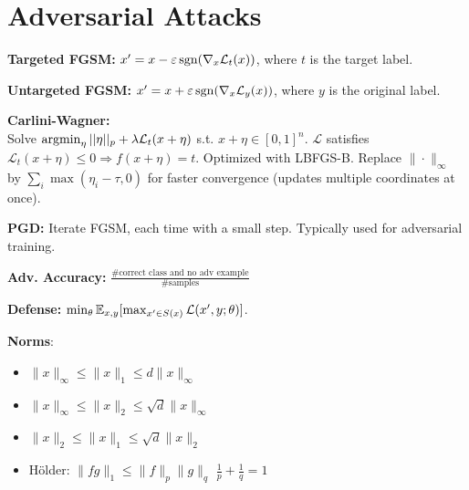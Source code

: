 \section{Adversarial Attacks}
\textbf{Targeted FGSM:} $x^\prime = x - \varepsilon \operatorname{\operatorname{sgn}}(\nabla_x \mathcal{L}_t(x))$, where $t$ is the target label.

\textbf{Untargeted FGSM:} $x^\prime = x + \varepsilon \operatorname{\operatorname{sgn}}(\nabla_x \mathcal{L}_y (x))$, where $y$ is the original label.

\textbf{Carlini-Wagner:}\\
Solve $\operatorname{\operatorname{argmin}}_\eta ||\eta||_p+\lambda \mathcal{L}_t(x+\eta)$ s.t. $x+\eta\in [0,1]^n$. $\mathcal{L}$ satisfies $\mathcal{L}_t(x+\eta)\le 0 \Rightarrow f(x+\eta)=t$. Optimized with LBFGS-B. Replace $\|\cdot\|_{\infty}$ by $\sum_i \max(\eta_i-\tau,0)$ for faster convergence (updates multiple coordinates at once).

\textbf{PGD:} Iterate FGSM, each time with a small step. Typically used for adversarial training.

\textbf{Adv. Accuracy:} $\frac{\#\text{correct class and no adv example}}{\#\text{samples}}$

\textbf{Defense:} $\min_\theta \mathbb{E}_{x,y} [\max_{x^\prime\in S(x)} \mathcal{L}(x^\prime, y; \theta)]$.

\textbf{Norms}:
\begin{itemize}
    \item[] $\|x\|_\infty\leq\|x\|_1\leq d\|x\|_\infty$
    \item[] $\|x\|_\infty\leq\|x\|_2\leq\sqrt{d}\|x\|_\infty$
    \item[] $\|x\|_2\leq\|x\|_1\leq\sqrt{d}\|x\|_2$
    \item[] Hölder: $\|fg\|_1\leq\|f\|_p\|g\|_q$  $\frac{1}{p}+\frac{1}{q}=1$
\end{itemize}
